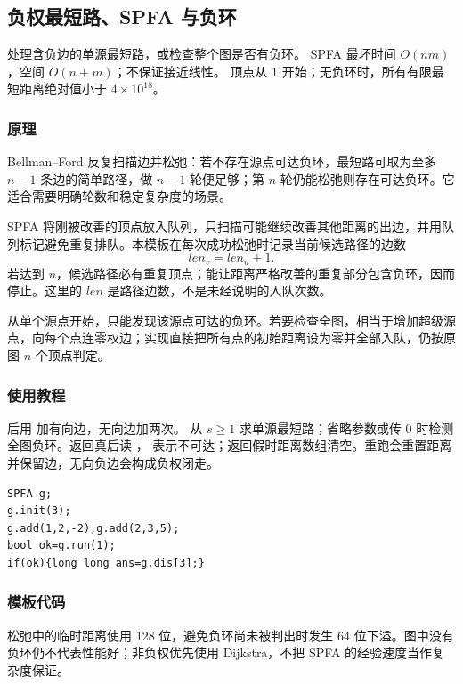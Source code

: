 \subsection{负权最短路、SPFA 与负环}
\label{algo:spfa}
\AlgorithmInfo
    {处理含负边的单源最短路，或检查整个图是否有负环。}
    {SPFA 最坏时间 $O(nm)$，空间 $O(n+m)$；不保证接近线性。}
    {顶点从 1 开始；无负环时，所有有限最短距离绝对值小于 $4\times10^{18}$。}

\subsubsection*{原理}
Bellman--Ford 反复扫描边并松弛：若不存在源点可达负环，最短路可取为至多 $n-1$ 条边的简单路径，做 $n-1$ 轮便足够；第 $n$ 轮仍能松弛则存在可达负环。它适合需要明确轮数和稳定复杂度的场景。

SPFA 将刚被改善的顶点放入队列，只扫描可能继续改善其他距离的出边，并用队列标记避免重复排队。本模板在每次成功松弛时记录当前候选路径的边数
\[
    len_v=len_u+1.
\]
若达到 $n$，候选路径必有重复顶点；能让距离严格改善的重复部分包含负环，因而停止。这里的 $len$ 是路径边数，不是未经说明的入队次数。

从单个源点开始，只能发现该源点可达的负环。若要检查全图，相当于增加超级源点，向每个点连零权边；实现直接把所有点的初始距离设为零并全部入队，仍按原图 $n$ 个顶点判定。

\subsubsection*{使用教程}
 后用  加有向边，无向边加两次。 从 $s\ge1$ 求单源最短路；省略参数或传 0 时检测全图负环。返回真后读 ， 表示不可达；返回假时距离数组清空。重跑会重置距离并保留边，无向负边会构成负权闭走。
\begin{lstlisting}[style=mtycpp,numbers=none]
SPFA g;
g.init(3);
g.add(1,2,-2),g.add(2,3,5);
bool ok=g.run(1);
if(ok){long long ans=g.dis[3];}
\end{lstlisting}

\subsubsection*{模板代码}

松弛中的临时距离使用 128 位，避免负环尚未被判出时发生 64 位下溢。图中没有负环仍不代表性能好；非负权优先使用 Dijkstra，不把 SPFA 的经验速度当作复杂度保证。
